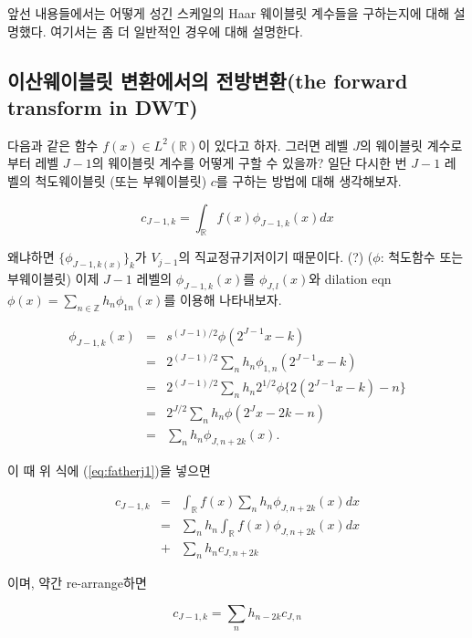 \documentclass[b5paper,]{book}
\theoremstyle{definition}
\theoremstyle{definition}
\theoremstyle{definition}
\theoremstyle{remark}
\begin{document}
앞선 내용들에서는 어떻게 성긴 스케일의 Haar 웨이블릿 계수들을 구하는지에
대해 설명했다. 여기서는 좀 더 일반적인 경우에 대해 설명한다.

\subsection{이산웨이블릿 변환에서의 전방변환(the forward transform in
DWT)}\label{--the-forward-transform-in-dwt}

다음과 같은 함수 \(f(x)\in L^{2}(\mathbb{R})\)이 있다고 하자. 그러면
레벨 \(J\)의 웨이블릿 계수로부터 레벨 \(J-1\)의 웨이블릿 계수를 어떻게
구할 수 있을까? 일단 다시한 번 \(J-1\) 레벨의 척도웨이블릿 (또는
부웨이블릿) \(c\)를 구하는 방법에 대해 생각해보자.

\begin{equation}\label{eq:fatherj1}
c_{J-1,k}=\int_{\mathbb{R}}f(x)\phi_{J-1,k}(x)dx
\end{equation}

왜냐하면 \(\{ \phi_{J-1,k(x)}\}_{k}\)가 \(V_{j-1}\)의 직교정규기저이기
때문이다. (?) (\(\phi\): 척도함수 또는 부웨이블릿) 이제 \(J-1\) 레벨의
\(\phi_{J-1,k}(x)\)를 \(\phi_{J,l}(x)\)와 dilation eqn
\(\phi(x)=\sum_{n\in\mathbb{Z}}h_{n}\phi_{1n}(x)\)를 이용해 나타내보자.

\begin{eqnarray}\label{eq:fatherj2}
\phi_{J-1,k}(x)&=&s^{(J-1)/2}\phi(2^{J-1}x-k)\nonumber\\
&=&2^{(J-1)/2}\sum_{n}h_{n}\phi_{1,n}(2^{J-1}x-k)\nonumber\\
&=&2^{(J-1)/2}\sum_{n}h_{n}2^{1/2}\phi\{2(2^{J-1}x-k)-n\}\nonumber\\
&=&2^{J/2}\sum_{n}h_{n}\phi(2^{J}x-2k-n)\nonumber\\ 
&=&\sum_{n}h_{n}\phi_{J,n+2k}(x).
\end{eqnarray}

이 때 위 식에 (\eqref{eq:fatherj1})을 넣으면

\begin{eqnarray}\label{eq:fatherj3}
c_{J-1,k}&=&\int_{\mathbb{R}}f(x)\sum_{n}h_{n}\phi_{J,n+2k}(x)dx\nonumber\\
&=&\sum_{n}h_{n}\int_{\mathbb{R}}f(x)\phi_{J,n+2k}(x)dx\nonumber\\
&+&\sum_{n}h_{n}c_{J,n+2k}
\end{eqnarray}

이며, 약간 re-arrange하면

\begin{equation}\label{eq:fatherj4}
c_{J-1,k}=\sum_{n}h_{n-2k}c_{J,n}
\end{equation}
\end{document}
